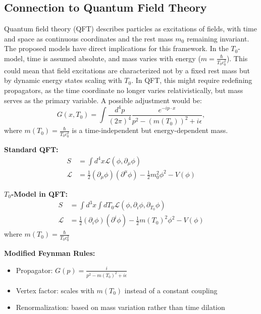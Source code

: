 \documentclass[a4paper,12pt]{article}
\begin{document}
	\subsection{Connection to Quantum Field Theory}
	Quantum field theory (QFT) describes particles as excitations of fields, with time and space as continuous coordinates and the rest mass \( m_0 \) remaining invariant. The proposed models have direct implications for this framework. In the \( T_0 \)-model, time is assumed absolute, and mass varies with energy (\( m = \frac{\hbar}{T_0 c_0^2} \)). This could mean that field excitations are characterized not by a fixed rest mass but by dynamic energy states scaling with \( T_0 \). In QFT, this might require redefining propagators, as the time coordinate no longer varies relativistically, but mass serves as the primary variable. A possible adjustment would be:
	\[
	G(x, T_0) = \int \frac{d^4p}{(2\pi)^4} \frac{e^{-ip \cdot x}}{p^2 - (m(T_0))^2 + i\epsilon},
	\]
	where \( m(T_0) = \frac{\hbar}{T_0 c_0^2} \) is a time-independent but energy-dependent mass.
	
	\begin{tcolorbox}[colback=yellow!5!white,colframe=yellow!75!black,title=Reformulation of QFT Concepts]
		\textbf{Standard QFT:}
		\begin{align}
			S &= \int d^4x \mathcal{L}(\phi, \partial_\mu\phi) \\
			\mathcal{L} &= \frac{1}{2}(\partial_\mu\phi)(\partial^\mu\phi) - \frac{1}{2}m_0^2\phi^2 - V(\phi)
		\end{align}
		
		\textbf{$T_0$-Model in QFT:}
		\begin{align}
			S &= \int d^3x \int dT_0 \mathcal{L}(\phi, \partial_i\phi, \partial_{T_0}\phi) \\
			\mathcal{L} &= \frac{1}{2}(\partial_i\phi)(\partial^i\phi) - \frac{1}{2}m(T_0)^2\phi^2 - V(\phi)
		\end{align}
		where \( m(T_0) = \frac{\hbar}{T_0 c_0^2} \)
		
		\textbf{Modified Feynman Rules:}
		\begin{itemize}
			\item Propagator: \( G(p) = \frac{i}{p^2 - m(T_0)^2 + i\epsilon} \)
			\item Vertex factor: scales with \( m(T_0) \) instead of a constant coupling
			\item Renormalization: based on mass variation rather than time dilation
		\end{itemize}
	\end{tcolorbox}
	
\end{document}
